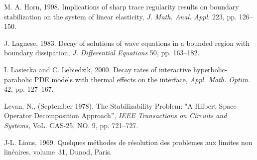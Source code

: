 \documentclass[11pt]{article}
\begin{document}
\begin{thebibliography}{99}

 M. A. Horn, 1998. Implications of sharp trace regularity results on boundary stabilization on the system of linear elasticity, \emph{J. Math. Anal. Appl.} 223, pp. 126--150.



 J. Lagnese, 1983. Decay of  solutions of wave equations in a bounded region with boundary dissipation, \emph{J. Differential Equations} 50, pp. 163--182.

 I. Lasiecka and C. Lebiedzik, 2000. Decay rates of interactive hyperbolic-parabolic PDE models with thermal effects on the interface, \emph{Appl. Math. Optim.} 42, pp. 127--167.


 Levan, N., (September 1978). The Stabilizability Problem: "A Hilbert Space Operator Decomposition Approach”, \emph{IEEE Transactions on Circuits and Systems,} VoL. CAS-25, NO. 9, pp. 721--727.


 J-L. Lions, 1969.
Quelques m{\'e}thodes de r{\'e}solution des problemes aux
  limites non lin{\'e}aires, volume~31, Dunod, Paris.




\end{thebibliography}
\end{document}
